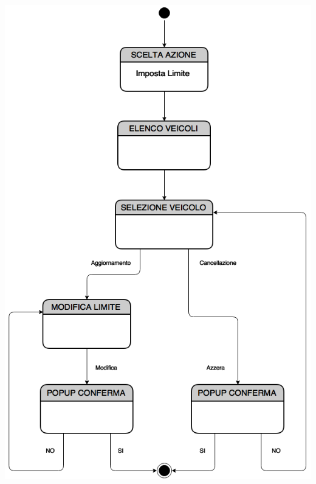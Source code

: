 \documentclass[a4paper,12pt]{beamer}
\begin{document}
\begin{frame}

\begin{center}
\includegraphics[scale=0.2]{../UseCase/Limite.png}
\end{center}
\end{frame}


\pagebreak
\end{document}
